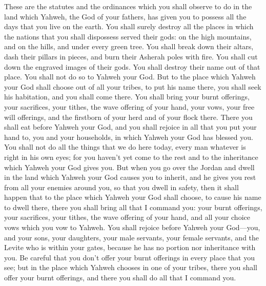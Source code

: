  These are the statutes and the ordinances which you shall
observe to do in the land which Yahweh, the God of your fathers, has
given you to possess all the days that you live on the earth.
 You shall surely destroy all the places in which the
nations that you shall dispossess served their gods: on the high
mountains, and on the hills, and under every green tree. 
You shall break down their altars, dash their pillars in pieces, and
burn their Asherah poles with fire. You shall cut down the engraved
images of their gods. You shall destroy their name out of that place.
 You shall not do so to Yahweh your God.  But to
the place which Yahweh your God shall choose out of all your tribes, to
put his name there, you shall seek his habitation, and you shall come
there.  You shall bring your burnt offerings, your
sacrifices, your tithes, the wave offering of your hand, your vows, your
free will offerings, and the firstborn of your herd and of your flock
there.  There you shall eat before Yahweh your God, and you
shall rejoice in all that you put your hand to, you and your households,
in which Yahweh your God has blessed you.  You shall not do
all the things that we do here today, every man whatever is right in his
own eyes;  for you haven't yet come to the rest and to the
inheritance which Yahweh your God gives you.  But when you
go over the Jordan and dwell in the land which Yahweh your God causes
you to inherit, and he gives you rest from all your enemies around you,
so that you dwell in safety,  then it shall happen that to
the place which Yahweh your God shall choose, to cause his name to dwell
there, there you shall bring all that I command you: your burnt
offerings, your sacrifices, your tithes, the wave offering of your hand,
and all your choice vows which you vow to Yahweh.  You
shall rejoice before Yahweh your God---you, and your sons, your
daughters, your male servants, your female servants, and the Levite who
is within your gates, because he has no portion nor inheritance with
you.  Be careful that you don't offer your burnt offerings
in every place that you see;  but in the place which Yahweh
chooses in one of your tribes, there you shall offer your burnt
offerings, and there you shall do all that I command you.

